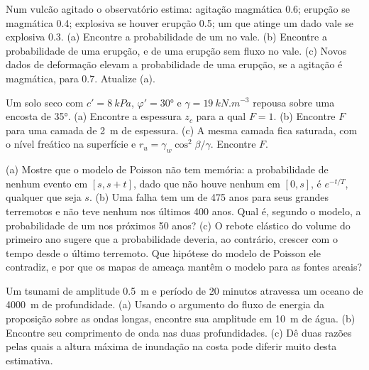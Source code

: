 \begin{exercise}[$\star\star$]\label{exo:b2:geological-hazards:8}
Num vulcão agitado o observatório estima: agitação magmática 0.6; erupção se magmática 0.4;
explosiva se houver erupção 0.5; um  que atinge um dado vale se explosiva 0.3. (a) Encontre
a probabilidade de um  no vale. (b) Encontre a probabilidade de uma erupção, e
de uma erupção sem fluxo no vale. (c) Novos dados de deformação elevam a probabilidade de uma
erupção, se a agitação é magmática, para 0.7. Atualize (a).
\end{exercise}

\begin{exercise}[$\star\star$]\label{exo:b2:geological-hazards:9}
Um solo seco com $c' = \qty{8}{kPa}$, $\varphi' = \ang{30}$ e $\gamma = \qty{19}{kN.m^{-3}}$ repousa sobre
uma encosta de \ang{35}. (a) Encontre a espessura $z_c$ para a qual $F = 1$. (b) Encontre $F$ para uma camada
de \qty{2}{m} de espessura. (c) A mesma camada fica saturada, com o nível freático na superfície e
$r_u = \gamma_w\cos^2\beta/\gamma$. Encontre $F$.
\end{exercise}

\begin{exercise}[$\star\star\star$]\label{exo:b2:geological-hazards:10}
(a) Mostre que o modelo de Poisson não tem memória: a probabilidade de nenhum evento em $[s, s + t]$, dado
que não houve nenhum em $[0, s]$, é $e^{-t/T}$, qualquer que seja $s$. (b) Uma falha tem um  de 475 anos para seus
grandes terremotos e não teve nenhum nos últimos 400 anos. Qual é, segundo o modelo, a probabilidade de um
nos próximos 50 anos? (c) O rebote elástico do volume do primeiro ano sugere que a probabilidade
deveria, ao contrário, crescer com o tempo desde o último terremoto. Que hipótese do modelo de Poisson
ele contradiz, e por que os mapas de ameaça mantêm o modelo para as fontes areais?
\end{exercise}

\begin{exercise}[$\star\star\star$]\label{exo:b2:geological-hazards:11}
Um tsunami de amplitude \qty{0.5}{m} e período de 20 minutos atravessa um oceano de \qty{4000}{m} de profundidade. (a)
Usando o argumento do fluxo de energia da proposição sobre as ondas longas, encontre sua amplitude em \qty{10}{m}
de água. (b) Encontre seu comprimento de onda nas duas profundidades. (c) Dê duas razões pelas quais a altura máxima de inundação na costa
pode diferir muito desta estimativa.
\end{exercise}

